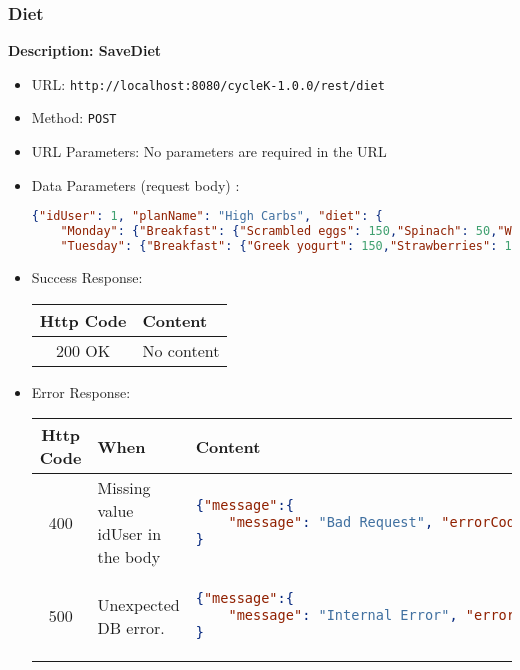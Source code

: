 \subsubsection*{Diet}
\textbf{Description: SaveDiet}
\begin{itemize}
    \item URL: \texttt{http://localhost:8080/cycleK-1.0.0/rest/diet}
    \item Method: \texttt{POST}
    \item URL Parameters: No parameters are required in the URL
    \item Data Parameters (request body) : 
    \begin{lstlisting}[language=json,firstnumber=1]
    {"idUser": 1, "planName": "High Carbs", "diet": {
    "Monday": {"Breakfast": {"Scrambled eggs": 150,"Spinach": 50,"Whole grain toast": 50},"Lunch": {"Quinoa": 100,"Mixed vegetables": {"bell peppers": 50,"cucumber": 50,"tomato": 50},"Grilled chicken": 150},"Dinner": {"Salmon": 150,"Broccoli": 100,"Brown rice": 100}},
    "Tuesday": {"Breakfast": {"Greek yogurt": 150,"Strawberries": 100,"Granola": 30},"Lunch": {"Turkey": 100,"Avocado": 50,"Lettuce": 50,"Tomato": 50,"Carrot sticks": 100},"Dinner": {"Kidney beans": 100,"Corn": 100,"Bell peppers": 50,"Whole grain garlic bread": 50}}}}
\end{lstlisting}
\item Success Response:
\begin{longtable}{|c|p{13.5cm}|}
\hline
\textbf{Http Code} & \textbf{Content} \\\hline
200 OK & No content \\\hline
\end{longtable}

\item Error Response:
\begin{longtable}{|c|p{4cm}|p{9cm}|}
\hline
\textbf{Http Code} & \textbf{When} & \textbf{Content} \\\hline
400 &  Missing value idUser in the body &
\begin{lstlisting}[language=json,firstnumber=1]
{"message":{
    "message": "Bad Request", "errorCode": "-107", "errorDetails": "No idUser JSON object found in the request.", "error": true}
}
\end{lstlisting}\\\hline
500 & Unexpected DB error. & 
\begin{lstlisting}[language=json,firstnumber=1]
{"message":{
    "message": "Internal Error", "errorCode": "-214", "errorDetails": "Unexpected error while saving diet.", "error": true}
}
\end{lstlisting}\\\hline
\end{longtable}    
\end{itemize}
\newpage

